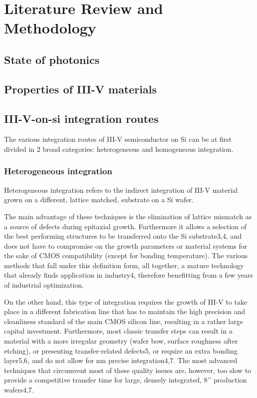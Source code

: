 \chapter{Literature Review and Methodology}
\label{chap:review}

\section{State of photonics}
\section{Properties of III-V materials}
\section{\texorpdfstring{III-V-on-\acs{si} integration routes}{III-V-on-Si integration routes}}
The various integration routes of III-V semiconductor on Si can be at first divided in 2 broad categories: heterogeneous and homogeneous integration.
\subsection{Heterogeneous integration}
Heterogeneous integration refers to the indirect integration of III-V material grown on a different, lattice matched, substrate on a Si wafer. 
\par
The main advantage of these techniques is the elimination of lattice mismatch as a source of defects during epitaxial growth. Furthermore it allows a selection of the best performing structures to be transferred onto the Si substrate3,4, and does not have to compromise on the growth parameters or material systems for the sake of CMOS compatibility (except for bonding temperature). The various methods that fall under this definition form, all together, a mature technology that already finds application in industry4, therefore benefitting from a few years of industrial optimization.
\par
On the other hand, this type of integration requires the growth of III-V to take place in a different fabrication line that has to maintain the high precision and cleanliness standard of the main CMOS silicon line, resulting in a rather large capital investment. Furthermore, most classic transfer steps can result in a material with a more irregular geometry (wafer bow, surface roughness after etching), or presenting transfer-related defects5, or require an extra bonding layer5,6, and do not allow for nm precise integration4,7. The most advanced techniques that circumvent most of these quality issues are, however, too slow to provide a competitive transfer time for large, densely integrated, 8’’ production wafers4,7.
